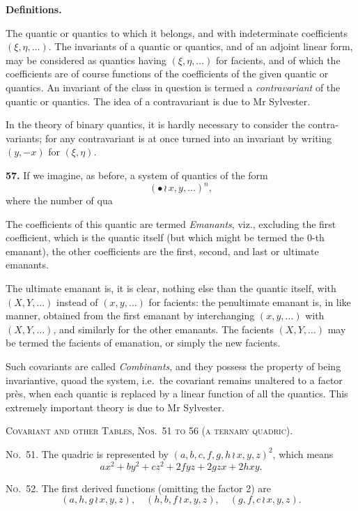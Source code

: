 \documentclass[11pt,a4paper]{book}
\begin{document}
\begin{center}
\clearpage
\noindent\textbf{Definitions.}

The quantic or quantics to which it belongs, and with indeterminate coefficients
$(\xi, \eta, \ldots)$. The invariants of a quantic or quantics, and of an adjoint linear form, may
be considered as quantics having $(\xi, \eta, \ldots)$ for facients, and of which the coefficients
are of course functions of the coefficients of the given quantic or quantics.
An invariant of the class in question is termed a \textit{contravariant} of the quantic
or quantics. The idea of a contravariant is due to Mr Sylvester.

In the theory of binary quantics, it is hardly necessary to consider the contra-
variants; for any contravariant is at once turned into an invariant by writing
$(y, -x)$ for $(\xi, \eta)$.

\textbf{57.} If we imagine, as before, a system of quantics of the form
\[(\bullet\, \wr\, x, y, \ldots)^n,\]
where the number of qua

\bigskip
The coefficients of this quantic are termed \textit{Emanants}, viz., excluding the first
coefficient, which is the quantic itself (but which might be termed the 0-th emanant),
the other coefficients are the first, second, and last or ultimate emanants.

The ultimate emanant is, it is clear, nothing else than the quantic itself,
with $(X, Y, \ldots)$ instead of $(x, y, \ldots)$ for facients: the penultimate emanant is, in like
manner, obtained from the first emanant by interchanging $(x, y, \ldots)$ with $(X, Y, \ldots)$,
and similarly for the other emanants. The facients $(X, Y, \ldots)$ may be termed
the facients of emanation, or simply the new facients.

Such covariants are called \textit{Combinants}, and they possess the property of being
invariantive, quoad the system, i.e.\ the covariant remains unaltered to a factor pr\`es,
when each quantic is replaced by a linear function of all the quantics.
This extremely important theory is due to Mr Sylvester.

\clearpage
\noindent\textsc{Covariant and other Tables, Nos.~51 to 56 (a ternary quadric).}

\noindent\textsc{No.~51.} The quadric is represented by $(a, b, c, f, g, h \, \wr\, x, y, z)^2$,
which means
\[ax^2 + by^2 + cz^2 + 2fyz + 2gzx + 2hxy.\]

\noindent\textsc{No.~52.} The first derived functions (omitting the factor 2) are
\[(a, h, g \, \wr\, x, y, z),\quad (h, b, f \, \wr\, x, y, z),\quad (g, f, c \, \wr\, x, y, z).\]


\end{center}
\end{document}
